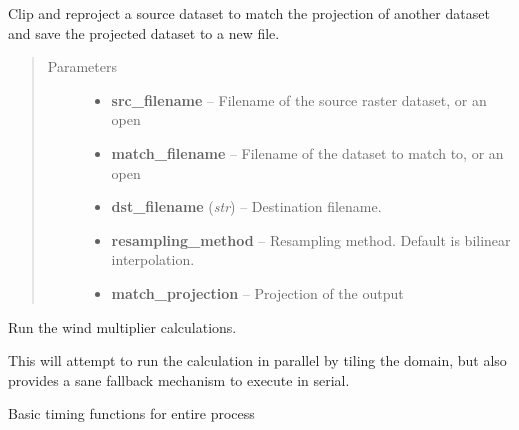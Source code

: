 \documentclass[letterpaper,10pt,english]{sphinxmanual}
\begin{document}
\begin{fulllineitems}
\label{docs/all_multipliers:all_multipliers.reproject_dataset}
Clip and reproject a source dataset to match the projection of another
dataset and save the projected dataset to a new file.
\begin{quote}\begin{description}
\item[{Parameters}] \leavevmode\begin{itemize}
\item {} 
\textbf{src\_filename} -- Filename of the source raster dataset, or an
open 

\item {} 
\textbf{match\_filename} -- Filename of the dataset to match to, or an
open 

\item {} 
\textbf{dst\_filename} (\emph{str}) -- Destination filename.

\item {} 
\textbf{resampling\_method} -- Resampling method. Default is bilinear
interpolation.

\item {} 
\textbf{match\_projection} -- Projection of the output

\end{itemize}

\end{description}\end{quote}

\end{fulllineitems}



\begin{fulllineitems}
\label{docs/all_multipliers:all_multipliers.run}
Run the wind multiplier calculations.

This will attempt to run the calculation in parallel by tiling the
domain, but also provides a sane fallback mechanism to execute
in serial.

\end{fulllineitems}



\begin{fulllineitems}
\label{docs/all_multipliers:all_multipliers.timer}
Basic timing functions for entire process

\end{fulllineitems}
\end{document}
